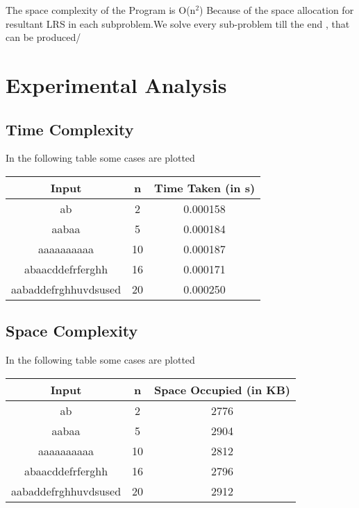 \documentclass[conference]{IEEEtran}
\begin{document}
The space complexity of the Program is O(n$^{2}$) Because of the space allocation for resultant LRS in each subproblem.We solve every sub-problem till the end , that can be produced/

\section{Experimental Analysis}
\subsection{Time Complexity}
In the following table some cases are plotted
\begin{center}
 \begin{tabular}{||c | c | c||} 
 \hline
 Input & n & Time Taken (in s) \\ [0.5ex] 
 \hline\hline
 ab & 2 & 0.000158 \\ 
 \hline
 aabaa & 5 & 0.000184 \\
 \hline
 aaaaaaaaaa & 10 & 0.000187 \\
 \hline
 abaacddefrferghh & 16 & 0.000171 \\
 \hline
 aabaddefrghhuvdsused & 20 & 0.000250 \\ [1ex] 
 \hline
\end{tabular}
\end{center}


\subsection{Space Complexity}
In the following table some cases are plotted
\begin{center}
 \begin{tabular}{||c | c | c||} 
 \hline
 Input & n & Space Occupied (in KB) \\ [0.5ex] 
 \hline\hline
 ab & 2 & 2776 \\ 
 \hline
 aabaa & 5 & 2904 \\
 \hline
 aaaaaaaaaa & 10 & 2812 \\
 \hline
 abaacddefrferghh & 16 & 2796 \\
 \hline
 aabaddefrghhuvdsused & 20 & 2912 \\ [1ex] 
 \hline
\end{tabular}
\end{center}
\end{document}
